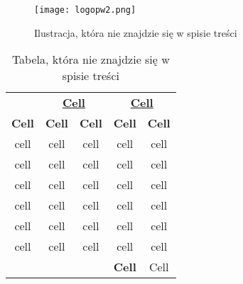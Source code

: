 \clearpage
{}
\noindent\lipsum[1-3]
\begin{figure}[!h]
	\centering \texttt{[image: logopw2.png]}
	\caption{Ilustracja, która nie znajdzie się w spisie treści}
\end{figure}
\lipsum[4-7]

\clearpage
{}
\lipsum[1-2]
\begin{table}[H] \centering
    \caption{Tabela, która nie znajdzie się w spisie treści}
    \label{tab:tab}
    \begin{tabular}{c c c c c}
        \toprule[1pt]
         & \multicolumn{2}{c}{\textbf{\uline{\hspace{0.5cm} Cell \hspace{0.5cm}}}} & \multicolumn{2}{c}{\textbf{\uline{\hspace{0.5cm} Cell \hspace{0.5cm}}}}   \\
        \textbf{{Cell}}  &\textbf{{Cell}}     &  \textbf{Cell}&   \textbf{Cell} &  \textbf{Cell} \\  \midrule
        cell  & cell & cell & cell & cell   \\
        cell  & cell & cell & cell & cell   \\
        cell  & cell & cell & cell & cell   \\
        cell  & cell & cell & cell & cell   \\
        cell  & cell & cell & cell & cell   \\ 
        cell  & cell & cell & cell & cell   \\ \midrule
        \multicolumn{4}{r}{\textbf{Cell}} & Cell \\
        \bottomrule[1pt]
    \end{tabular}
\end{table}
\lipsum[3-4]

